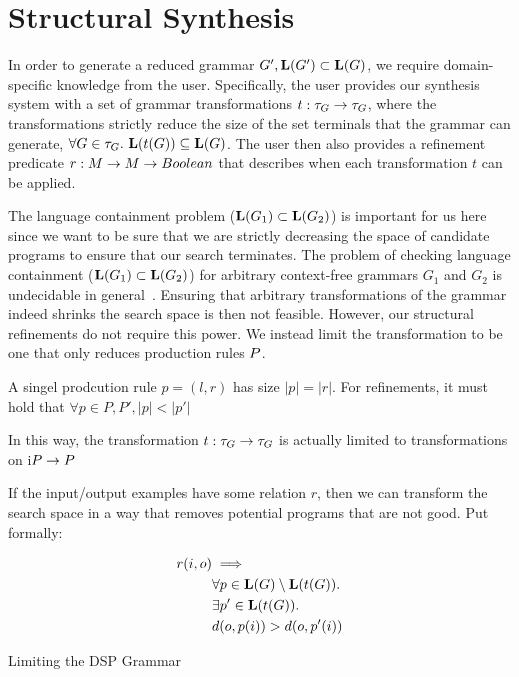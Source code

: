 \section{Structural Synthesis}
\label{sec:struct}
In order to generate a reduced grammar $G', \mathbf{L}(G') \subset \mathbf{L}(G)$, we require domain-specific knowledge from the user.
Specifically, the user provides our synthesis system with a set of grammar transformations \mbox{$t: \tau_{G} \to \tau_{G}$}, where the transformations strictly reduce the size of the set terminals that the grammar can generate, \mbox{$\forall G \in \tau_{G}. \ \mathbf{L}(t(G)) \subseteq \mathbf{L}(G)$}.
The user then also provides a refinement predicate $r: M \to M \to Boolean$ that describes when each transformation $t$ can be applied. 

The language containment problem ($\mathbf{L}(G_{1}) \subset \mathbf{L}(G_{2})$) is important for us here since we want to be sure that we are strictly decreasing the space of candidate programs to ensure that our search terminates.
The problem of checking language containment ($\mathbf{L}(G_{1}) \subset \mathbf{L}(G_{2})$) for arbitrary context-free grammars $G_1$ and $G_2$ is undecidable in general~\cite{hopcroft1969equivalence}.
Ensuring that arbitrary transformations of the grammar indeed shrinks the search space is then not feasible.
However, our structural refinements do not require this power.
We instead limit the transformation to be one that only reduces production rules $P$.

A singel prodcution rule $p = (l,r)$ has size $|p| = |r|$. 
For refinements, it must hold that $\forall p \in P,P', |p|<|p'|$

In this way, the transformation $t: \tau_{G} \to \tau_{G}$ is actually limited to transformations on i$P \to P$ 


If the input/output examples have some relation $r$, then we can transform the search space in a way that removes potential programs that are not good.
Put formally:

\begin{align*}
   r(i,o) &\implies \\
   & \forall p \in \mathbf{L}(G) \setminus \mathbf{L}(t(G)). \\
   & \exists p' \in \mathbf{L}(t(G)). \\
   & {d}(o,p(i)) > {d}(o,p'(i)) 
\end{align*}

\begin{exmp} Limiting the DSP Grammar

\end{exmp}
